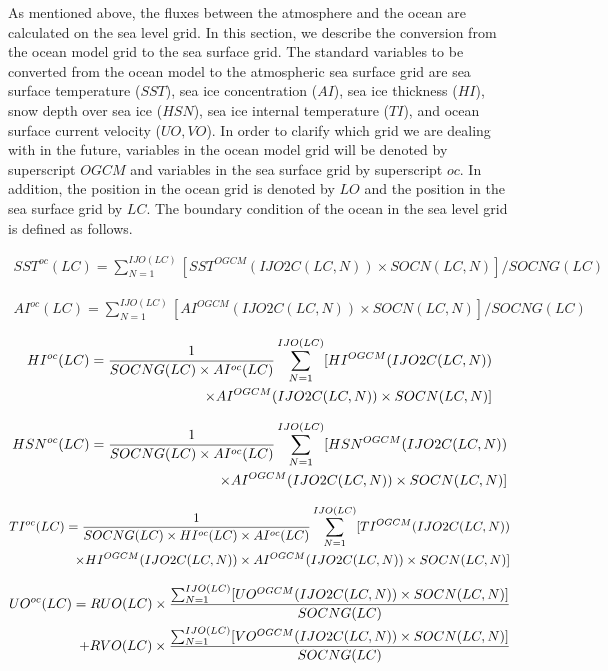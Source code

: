 As mentioned above, the fluxes between the atmosphere and the ocean are calculated on the sea level grid. In this section, we describe the conversion from the ocean model grid to the sea surface grid.
The standard variables to be converted from the ocean model to the atmospheric sea surface grid are sea surface temperature (\(SST\)), sea ice concentration (\(AI\)), sea ice thickness (\(HI\)), snow
depth over sea ice (\(HSN\)), sea ice internal temperature (\(TI\)), and ocean surface current velocity (\(UO,VO\)). In order to clarify which grid we are dealing with in the future, variables in the
ocean model grid will be denoted by superscript \(OGCM\) and variables in the sea surface grid by superscript \(oc\). In addition, the position in the ocean grid is denoted by \(LO\) and the position
in the sea surface grid by \(LC\). The boundary condition of the ocean in the sea level grid is defined as follows.

\begin{eqnarray} SST^{oc}(LC) = \sum_{N=1}^{IJO(LC)}[SST^{OGCM}(IJO2C(LC,N)) \times SOCN(LC,N)]/SOCNG(LC) \end{eqnarray}

\begin{eqnarray} AI^{oc}(LC) = \sum_{N=1}^{IJO(LC)}[AI^{OGCM}(IJO2C(LC,N)) \times SOCN(LC,N)]/SOCNG(LC) \end{eqnarray}

\begin{eqnarray} HI^{oc}(LC) = \frac{1}{{SOCNG(LC) \times AI^{oc}(LC)}}\sum_{N=1}^{IJO(LC)}[HI^{OGCM}(IJO2C(LC,N)) \notag\\ \times AI^{OGCM}(IJO2C(LC,N))   \times SOCN(LC,N)] \end{eqnarray}

\begin{eqnarray} HSN^{oc}(LC) = \frac{1}{{SOCNG(LC) \times AI^{oc}(LC)}}\sum_{N=1}^{IJO(LC)}[HSN^{OGCM}(IJO2C(LC,N)) \notag\\ \times AI^{OGCM}(IJO2C(LC,N)) \times SOCN(LC,N)] \end{eqnarray}

\begin{eqnarray} TI^{oc}(LC) = \frac{1}{{SOCNG(LC) \times HI^{oc}(LC) \times AI^{oc}(LC)}}  \sum_{N=1}^{IJO(LC)}[TI^{OGCM}(IJO2C(LC,N)) \notag\\ \times HI^{OGCM}(IJO2C(LC,N)) \times AI^{OGCM}(IJO2C(LC,N)) \times SOCN(LC,N)]  \end{eqnarray}

\begin{eqnarray} UO^{oc}(LC)= RUO(LC) \times  \frac{\sum_{N=1}^{IJO(LC)}[UO^{OGCM}(IJO2C(LC,N)) \times SOCN(LC,N)]}{SOCNG(LC)}  \notag\\ + RVO(LC) \times  \frac{\sum_{N=1}^{IJO(LC)}[VO^{OGCM}(IJO2C(LC,N)) \times SOCN(LC,N)]}{SOCNG(LC)} \end{eqnarray}


